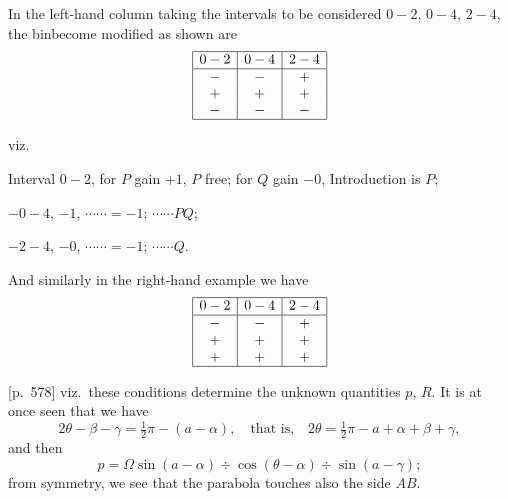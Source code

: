 \documentclass[11pt,a4paper]{book}
\begin{document}
In the left-hand column taking the intervals to be considered $0 - 2$, $0 - 4$, $2 - 4$, the binbecome modified as shown are
\[
\begin{array}{|c|c|c|}
\hline
0 - 2 & 0 - 4 & 2 - 4 \\
\hline
- & - & + \\
+ & + & + \\
- & - & - \\
\hline
\end{array}
\]

viz.

Interval $0 - 2$, for $P$ gain $+1$, $P$ free; for $Q$ gain $-0$, Introduction is $P$;

\hspace{2em}$- 0 - 4$, \quad $- 1$, \quad $\cdots \cdots = -1$; \quad $\cdots \cdots PQ$;

\hspace{2em}$- 2 - 4$, \quad $- 0$, \quad $\cdots \cdots = -1$; \quad $\cdots \cdots Q$.

And similarly in the right-hand example we have
\[
\begin{array}{|c|c|c|}
\hline
0 - 2 & 0 - 4 & 2 - 4 \\
\hline
- & - & + \\
+ & + & + \\
+ & + & + \\
\hline
\end{array}
\]

\bigskip

[p.~578] viz.\ these conditions determine the unknown quantities $p$, $R$. It is at once seen that we have
\[
2\theta - \beta - \gamma = \tfrac{1}{2}\pi - (a - \alpha), \quad \text{that is,}\quad 2\theta = \tfrac{1}{2}\pi - a + \alpha + \beta + \gamma,
\]
and then
\[
p = \Omega \sin (a - \alpha) \div \cos(\theta - \alpha) \div \sin(a - \gamma);
\]
from symmetry, we see that the parabola touches also the side $AB$.
\end{document}

